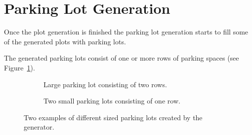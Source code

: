\section{Parking Lot Generation}

Once the plot generation is finished the parking lot generation starts to fill some of the generated plots with parking lots.

The generated parking lots consist of one or more rows of parking spaces (see Figure~\ref{fig:results_parking_sizebased}).

\begin{figure}[H]
   \centering
   \begin{subfigure}[b]{0.38\textwidth}
     \caption{Large parking lot consisting of two rows.}
   \end{subfigure}
   \quad
   \begin{subfigure}[b]{0.52\textwidth}
     \caption{Two small parking lots consisting of one row.}
   \end{subfigure}
     \caption{Two examples of different sized parking lots created by the generator.}
   \label{fig:results_parking_sizebased}
 \end{figure}

